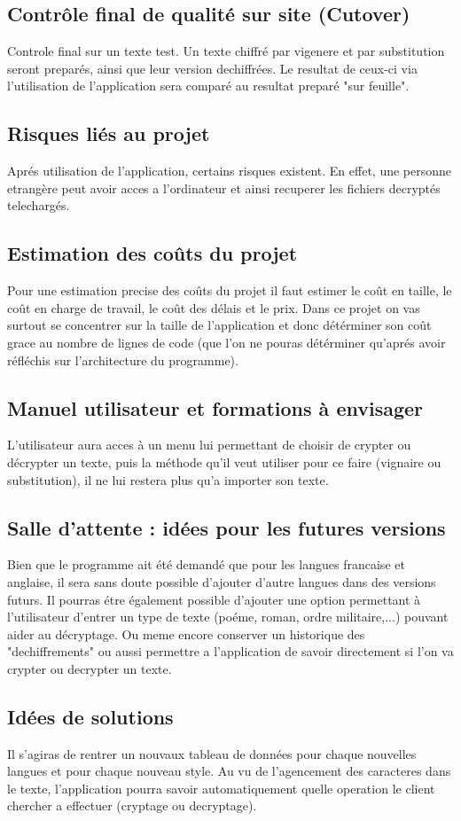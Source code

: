 \documentclass[a4]{article}
\begin{document}
		\subsection{Contrôle final de qualité sur site (Cutover)}
		Controle final sur un texte test. Un texte chiffré par vigenere et par substitution seront preparés, ainsi que leur version dechiffrées. Le resultat de ceux-ci via l'utilisation de l'application sera comparé au resultat preparé "sur feuille". 
		\subsection{Risques liés au projet}
		Aprés utilisation de l'application, certains risques existent. En effet, une personne etrangère peut avoir acces a l'ordinateur et ainsi recuperer les fichiers decryptés telechargés.
		\subsection{Estimation des coûts du projet}
		 	Pour une estimation precise des coûts du projet il faut estimer le coût en taille, 
			le coût en charge de travail, le coût des délais et le prix. Dans ce projet on vas surtout 
			se concentrer sur la taille de l'application et donc détérminer son coût grace au nombre de 
			lignes de code (que l'on ne pouras détérminer qu'aprés avoir réfléchis sur l'architecture du 				programme).		  		
		\subsection{Manuel utilisateur et formations à envisager}
			L'utilisateur aura acces à un menu lui permettant de choisir de crypter ou décrypter un texte,
			puis la méthode qu'il veut utiliser pour ce faire (vignaire ou substitution), il ne lui restera 
			plus qu'a importer son texte.
		\subsection{Salle d’attente : idées pour les futures versions}
			Bien que le programme ait été demandé que pour les langues francaise et anglaise, 
			il sera sans doute possible d'ajouter d'autre langues dans des versions futurs. 
			Il pourras étre également possible d'ajouter une option permettant à l'utilisateur
			d'entrer un type de texte (poéme, roman, ordre militaire,...) pouvant aider au décryptage. Ou meme encore conserver un historique des "dechiffrements" ou aussi permettre a l'application de savoir directement si l'on va crypter ou decrypter un texte.
		\subsection{Idées de solutions}
		 	Il s'agiras de rentrer un nouvaux tableau de données pour chaque nouvelles langues et pour 
			chaque nouveau style.
			Au vu de l'agencement des caracteres dans le texte, l'application pourra savoir automatiquement quelle operation le client chercher a effectuer (cryptage ou decryptage).
\end{document}
